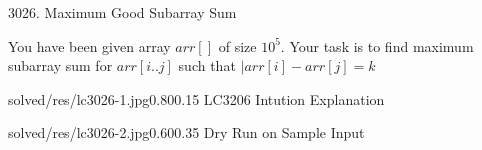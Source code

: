 \begin{problem}{3026. Maximum Good Subarray Sum}

    You have been given array $arr[]$ of size $10^5$. Your task is to find maximum subarray sum for $arr[i..j]$ such that $|arr[i] - arr[j] = k$


\end{problem}

\begin{fullwidth}
\begin{solution}[Ad-Hoc | $O(n^2)$ ]


    \begin{lfigure}{solved/res/lc3026-1.jpg}{0.80}{0.15}
        LC3206 Intution Explanation
    \end{lfigure}


    \begin{lfigure}{solved/res/lc3026-2.jpg}{0.60}{0.35}
        Dry Run on Sample Input
    \end{lfigure}
\end{solution}

\end{fullwidth}
    